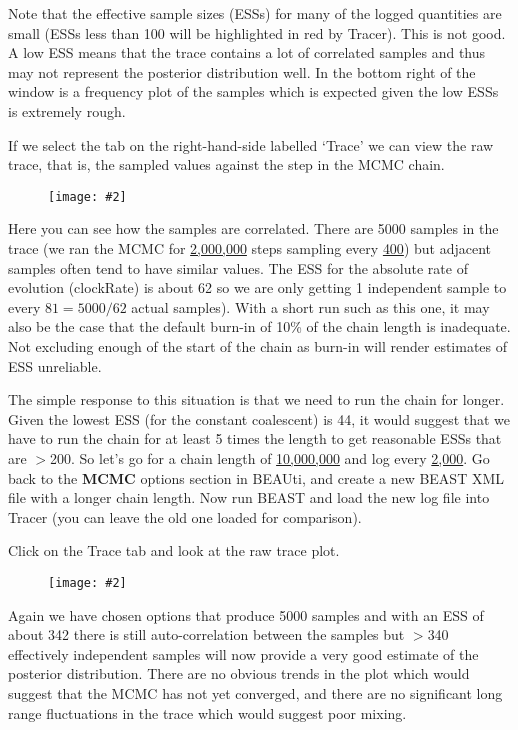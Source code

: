 \documentclass[12pt]{article}
\newcommand{\includeimage}[2][]{%
\texttt{[image: \#2]}
}
\newcommand{\chainLength}{{2,000,000}}
\newcommand{\logEvery}{{400}}
\newcommand{\chainLengthLong}{{10,000,000}}
\newcommand{\logEveryLong}{{2,000}}
\newcommand{\lowestESS}{{44}}
\begin{document}
Note that the effective sample sizes (ESSs) for many of the logged quantities are small (ESSs less than 100 will be highlighted in red by Tracer).
This is not good. A low ESS means that the trace contains a lot of correlated samples and thus may not represent the
posterior distribution well. In the bottom right of the window is a frequency plot of the samples which is expected given the
low ESSs is extremely rough.

If we select the tab on the right-hand-side labelled `Trace' we can view the raw trace, that is, the sampled values against the step in the MCMC chain.

\begin{figure}
\centering	
\includeimage[width=\textwidth]{figures/Tracer1}
\label{fig:Tracer1}
\end{figure}

Here you can see how the samples are correlated. There are 5000 samples in the trace (we ran the MCMC for \underline{\chainLength{}}
steps sampling every \underline{\logEvery{}}) but adjacent samples often tend to have similar values. The ESS for the absolute rate of evolution (clockRate) is about 62 so we are only getting 1 independent sample to every $81=5000/62$ actual samples). With a short run such as this one, it may also be the case that the default burn-in of 10\% of the chain length is inadequate. Not excluding enough of the start of the chain as burn-in will render estimates of ESS unreliable.

The simple response to this situation is that we need to run the chain for longer. Given the lowest ESS (for the constant coalescent) is \lowestESS{}, it
would suggest that we have to run the chain for at least 5 times the length to get reasonable ESSs that are $>$200. 
So let's go for a chain length of \underline{\chainLengthLong{}} and log every \underline{\logEveryLong{}}. Go back to the {\bf MCMC} options section in BEAUti, and create a new BEAST XML file with a longer chain length. Now run BEAST and load the new log file into Tracer (you can leave the old one loaded
for comparison). 

Click on the Trace tab and look at the raw trace plot.

\begin{figure}
\centering	
\includeimage[width=\textwidth]{figures/Tracer2}
\label{fig:Tracer2}
\end{figure}

Again we have chosen options that produce 5000 samples and with an ESS of about 342 there is still auto-correlation
between the samples but $>$340 effectively independent samples will now provide a very good estimate of the posterior distribution.
There are no obvious trends in the plot which would suggest that the MCMC has not yet converged, and there are no significant long range 
fluctuations in the trace which would suggest poor mixing.
\end{document}
